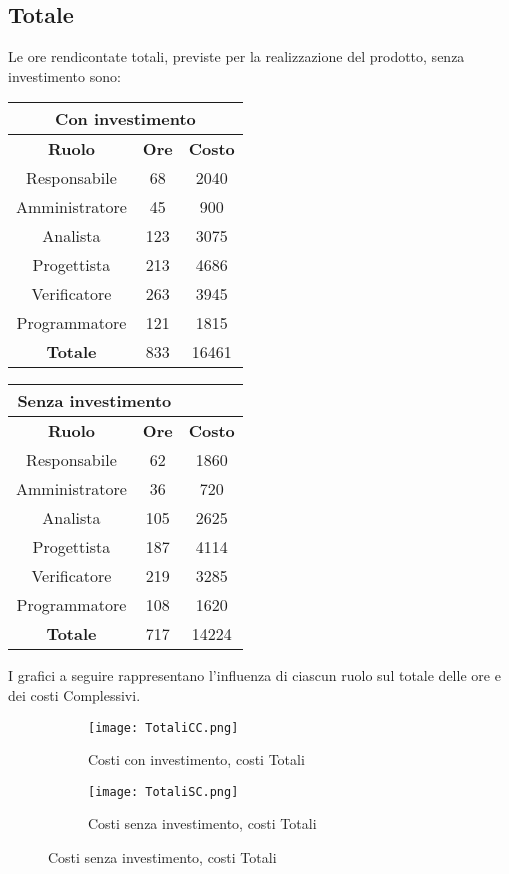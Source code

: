 \documentclass{scalatekids-article}
\begin{document}
\subsection{Totale}
Le ore rendicontate totali, previste per la realizzazione del prodotto, senza
investimento sono:
\begin{center}
  \normalsize
  \begin{tabular}{| c | c | c |}
    \hline
    \multicolumn{3}{|c|}{\textbf{Con investimento}}\\
    \hline
    \textbf{Ruolo} & \textbf{Ore} & \textbf{Costo}\\
    \hline
    Responsabile & 68 & 2040\\
    Amministratore & 45 & 900\\
    Analista & 123 & 3075\\
    Progettista & 213 & 4686\\
    Verificatore & 263 & 3945 \\
    Programmatore & 121 & 1815 \\
    \hline
    \textbf{Totale} & 833 & 16461\\
    \hline
  \end{tabular}
  \qquad
  \begin{tabular}{| c | c | c |}
    \hline
    \multicolumn{2}{|c|}{\textbf{Senza investimento}}\\
    \hline
    \textbf{Ruolo} & \textbf{Ore} & \textbf{Costo}\\
    \hline
    Responsabile & 62 & 1860\\
    Amministratore & 36 & 720\\
    Analista & 105 & 2625\\
    Progettista & 187 & 4114\\
    Verificatore & 219 & 3285\\
    Programmatore & 108 & 1620 \\
    \hline
    \textbf{Totale} & 717 & 14224 \\
    \hline
  \end{tabular}
\end{center}
I grafici a seguire rappresentano l'influenza di ciascun ruolo sul totale delle ore e dei costi Complessivi.
\begin{figure}[H]
  \begin{subfigure}[H]{0.47\textwidth}
    \texttt{[image: TotaliCC.png]}
    \caption{Costi con investimento, costi Totali}
  \end{subfigure}
  \qquad
  \begin{subfigure}[H]{0.47\textwidth}
    \texttt{[image: TotaliSC.png]}
    \caption{Costi senza investimento, costi Totali}
  \end{subfigure}
\end{figure}
\end{document}
